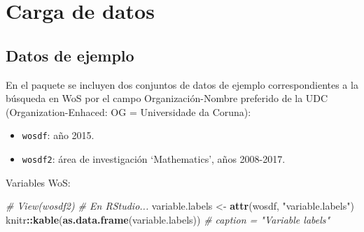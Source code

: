 \documentclass[
]{book}
\newenvironment{Shaded}{\begin{snugshade}}{\end{snugshade}}
\newcommand{\CommentTok}[1]{\textcolor[rgb]{0.56,0.35,0.01}{\textit{#1}}}
\newcommand{\KeywordTok}[1]{\textcolor[rgb]{0.13,0.29,0.53}{\textbf{#1}}}
\newcommand{\NormalTok}[1]{#1}
\newcommand{\OperatorTok}[1]{\textcolor[rgb]{0.81,0.36,0.00}{\textbf{#1}}}
\newcommand{\StringTok}[1]{\textcolor[rgb]{0.31,0.60,0.02}{#1}}
\begin{document}
\hypertarget{carga-de-datos}{%
\section{Carga de datos}\label{carga-de-datos}}

\hypertarget{datos-de-ejemplo-1}{%
\subsection{Datos de ejemplo}\label{datos-de-ejemplo-1}}

En el paquete se incluyen dos conjuntos de datos de ejemplo
correspondientes a la búsqueda en WoS
por el campo Organización-Nombre preferido de la UDC
(Organization-Enhaced: OG = Universidade da Coruna):

\begin{itemize}
\item
  \texttt{wosdf}: año 2015.
\item
  \texttt{wosdf2}: área de investigación `Mathematics', años 2008-2017.
\end{itemize}

Variables WoS:

\begin{Shaded}
\begin{Highlighting}[]
\CommentTok{# View(wosdf2) # En RStudio...}
\NormalTok{variable.labels <-}\StringTok{ }\KeywordTok{attr}\NormalTok{(wosdf, }\StringTok{"variable.labels"}\NormalTok{)}
\NormalTok{knitr}\OperatorTok{::}\KeywordTok{kable}\NormalTok{(}\KeywordTok{as.data.frame}\NormalTok{(variable.labels)) }\CommentTok{# caption = "Variable labels"}
\end{Highlighting}
\end{Shaded}
\end{document}

